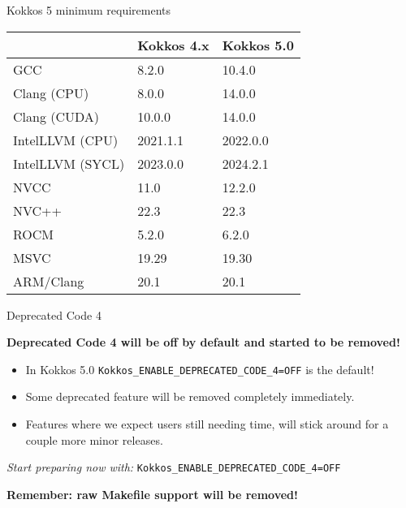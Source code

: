 \begin{frame}[fragile]{Kokkos 5 minimum requirements}

\begin{table}[]
\begin{tabular}{lll}
\multicolumn{1}{r}{} & Kokkos 4.x & Kokkos 5.0 \\ \hline
GCC                  & 8.2.0      & 10.4.0     \\
Clang (CPU)          & 8.0.0      & 14.0.0     \\
Clang (CUDA)         & 10.0.0     & 14.0.0     \\
IntelLLVM (CPU)      & 2021.1.1   & 2022.0.0   \\
IntelLLVM (SYCL)     & 2023.0.0   & 2024.2.1   \\
NVCC                 & 11.0       & 12.2.0     \\
NVC++                & 22.3       & 22.3       \\
ROCM                 & 5.2.0      & 6.2.0      \\
MSVC                 & 19.29      & 19.30      \\
ARM/Clang            & 20.1       & 20.1       \\ \hline
\end{tabular}
\end{table}

\end{frame}


\begin{frame}[fragile]{Deprecated Code 4}

\textbf{Deprecated Code 4 will be off by default and started to be removed!}

\begin{itemize}
\item In Kokkos 5.0 \texttt{Kokkos\_ENABLE\_DEPRECATED\_CODE\_4=OFF} is the default!
\item Some deprecated feature will be removed completely immediately.
\item Features where we expect users still needing time, will stick around for a couple more minor releases. 
\end{itemize}

\begin{center}
\textit{Start preparing now with:} \texttt{Kokkos\_ENABLE\_DEPRECATED\_CODE\_4=OFF}

\vspace{1cm}
\textbf{Remember: raw Makefile support will be removed!}
\end{center}
\end{frame}

